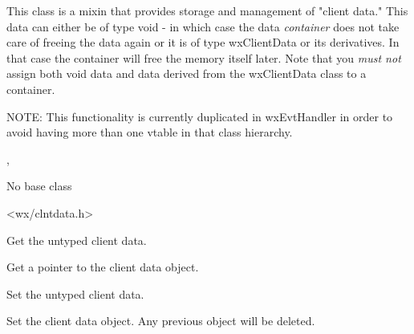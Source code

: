 This class is a mixin that provides storage and management of "client
data." This data can either be of type void - in which case the data
{\it container} does not take care of freeing the data again
or it is of type wxClientData or its derivatives. In that case the
container will free the memory itself later.
Note that you {\it must not} assign both void data and data
derived from the wxClientData class to a container.

NOTE: This functionality is currently duplicated in wxEvtHandler in
order to avoid having more than one vtable in that class hierarchy.


, 


No base class


<wx/clntdata.h>




\label{wxclientdatacontainerwxclientdatacontainer}



\label{wxclientdatacontainerdtor}



\label{wxclientdatacontainergetclientdata}


Get the untyped client data.

\label{wxclientdatacontainergetclientobject}


Get a pointer to the client data object.

\label{wxclientdatacontainersetclientdata}


Set the untyped client data.

\label{wxclientdatacontainersetclientobject}


Set the client data object. Any previous object will be deleted.

